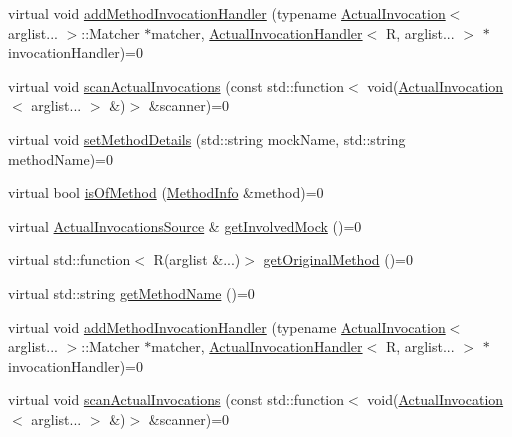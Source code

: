 \begin{DoxyCompactItemize}
\item 
virtual void \mbox{\hyperlink{structfakeit_1_1MethodMockingContext_1_1Context_a87b3a2d95daf8aaa2ae56b49e032c275}{add\+Method\+Invocation\+Handler}} (typename \mbox{\hyperlink{structfakeit_1_1ActualInvocation}{Actual\+Invocation}}$<$ arglist... $>$\+::Matcher $\ast$matcher, \mbox{\hyperlink{structfakeit_1_1ActualInvocationHandler}{Actual\+Invocation\+Handler}}$<$ R, arglist... $>$ $\ast$invocation\+Handler)=0
\item 
virtual void \mbox{\hyperlink{structfakeit_1_1MethodMockingContext_1_1Context_a89b30ea54bcf5e55c19696f77ad8423b}{scan\+Actual\+Invocations}} (const std\+::function$<$ void(\mbox{\hyperlink{structfakeit_1_1ActualInvocation}{Actual\+Invocation}}$<$ arglist... $>$ \&)$>$ \&scanner)=0
\item 
virtual void \mbox{\hyperlink{structfakeit_1_1MethodMockingContext_1_1Context_a9eb0cf6ed84ea4bd63333503bd6bdc1a}{set\+Method\+Details}} (std\+::string mock\+Name, std\+::string method\+Name)=0
\item 
virtual bool \mbox{\hyperlink{structfakeit_1_1MethodMockingContext_1_1Context_a126835068d4a7bcbf01f47080e690510}{is\+Of\+Method}} (\mbox{\hyperlink{structfakeit_1_1MethodInfo}{Method\+Info}} \&method)=0
\item 
virtual \mbox{\hyperlink{structfakeit_1_1ActualInvocationsSource}{Actual\+Invocations\+Source}} \& \mbox{\hyperlink{structfakeit_1_1MethodMockingContext_1_1Context_aab7f9487475b01f85e81b76cdf6c4860}{get\+Involved\+Mock}} ()=0
\item 
virtual std\+::function$<$ R(arglist \&...)$>$ \mbox{\hyperlink{structfakeit_1_1MethodMockingContext_1_1Context_a1878bb27937f4984d5c43e20c2b0b626}{get\+Original\+Method}} ()=0
\item 
virtual std\+::string \mbox{\hyperlink{structfakeit_1_1MethodMockingContext_1_1Context_ab5f7cc2c8d00214baacaad4c49ccf17f}{get\+Method\+Name}} ()=0
\item 
virtual void \mbox{\hyperlink{structfakeit_1_1MethodMockingContext_1_1Context_a87b3a2d95daf8aaa2ae56b49e032c275}{add\+Method\+Invocation\+Handler}} (typename \mbox{\hyperlink{structfakeit_1_1ActualInvocation}{Actual\+Invocation}}$<$ arglist... $>$\+::Matcher $\ast$matcher, \mbox{\hyperlink{structfakeit_1_1ActualInvocationHandler}{Actual\+Invocation\+Handler}}$<$ R, arglist... $>$ $\ast$invocation\+Handler)=0
\item 
virtual void \mbox{\hyperlink{structfakeit_1_1MethodMockingContext_1_1Context_a89b30ea54bcf5e55c19696f77ad8423b}{scan\+Actual\+Invocations}} (const std\+::function$<$ void(\mbox{\hyperlink{structfakeit_1_1ActualInvocation}{Actual\+Invocation}}$<$ arglist... $>$ \&)$>$ \&scanner)=0

\end{DoxyCompactItemize}
